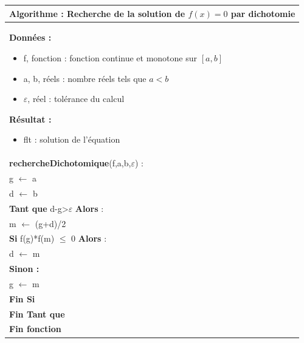 \documentclass[10pt]{article}
\begin{document}
\begin{pseudo}
\begin{center}
\begin{tabular}{p{}}
\hline
\textbf{Algorithme :} Recherche de la solution de $f(x)=0$ par dichotomie \\
\hline
\textbf{Données :}
\begin{itemize}
\item \textsf{f}, fonction : fonction continue et monotone sur $[a,b]$
\item \textsf{a, b}, réels : nombre réels tels que $a<b$
\item \textsf{$\varepsilon$}, réel : tolérance du calcul
\end{itemize}
\textbf{Résultat :} 
\begin{itemize}
\item flt : solution de l'équation
\end{itemize}
\\
\textbf{rechercheDichotomique}(\textsf{f,a,b,$\varepsilon$}) :\\
\hspace{.4cm}\textsf{g} $\leftarrow$ \textsf{a} \\
\hspace{.4cm}\textsf{d} $\leftarrow$ \textsf{b} \\
\hspace{.4cm}\textbf{Tant que} \textsf{d-g>$\varepsilon$} \textbf{Alors} : \\
\hspace{.8cm}\textsf{m} $\leftarrow$ \textsf{(g+d)/2} \\
\hspace{.8cm}\textbf{Si} \textsf{f(g)*f(m) $\leq$ 0} \textbf{Alors} : \\
\hspace{1.2cm}\textsf{d $\leftarrow$  m} \\
\hspace{.8cm} \textbf{Sinon :} \\
\hspace{1.2cm}\textsf{g $\leftarrow$  m} \\
\hspace{.8cm} \textbf{Fin Si}\\
\hspace{.4cm} \textbf{Fin Tant que}\\
\textbf{Fin fonction} \\
\hline
\end{tabular}
\end{center}
\end{pseudo}
\end{document}
